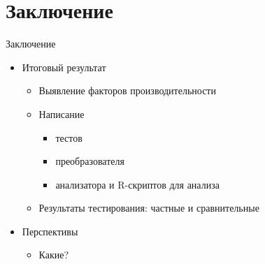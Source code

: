 \section{Заключение}

\begin{frame}{Заключение}
	\begin{itemize}
		\item Итоговый результат
		\begin{itemize}
			\item Выявление факторов производительности
			\item Написание
			\begin{itemize}
				\item тестов
				\item преобразователя
				\item анализатора и R-скриптов для анализа
			\end{itemize}
			\item Результаты тестирования: частные и сравнительные
		\end{itemize}
		\item Перспективы
		\begin{itemize}
			\item  Какие?
		\end{itemize}
	\end{itemize}
\end{frame}


